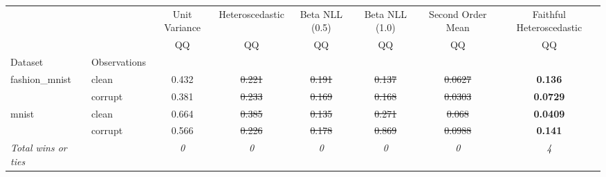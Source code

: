 \begin{tabular}{ll|c|c|c|c|c|c}
\toprule
{} & {} & {Unit Variance} & {Heteroscedastic} & {Beta NLL (0.5)} & {Beta NLL (1.0)} & {Second Order Mean} & {Faithful Heteroscedastic} \\
{} & {} & {QQ} & {QQ} & {QQ} & {QQ} & {QQ} & {QQ} \\
{Dataset} & {Observations} & {} & {} & {} & {} & {} & {} \\
\midrule
\multirow[t]{2}{*}{fashion_mnist} & clean & 0.432 & \sout{0.221} & \sout{0.191} & \sout{0.137} & \sout{0.0627} & \textbf{0.136} \\
 & corrupt & 0.381 & \sout{0.233} & \sout{0.169} & \sout{0.168} & \sout{0.0303} & \textbf{0.0729} \\
\multirow[t]{2}{*}{mnist} & clean & 0.664 & \sout{0.385} & \sout{0.135} & \sout{0.271} & \sout{0.068} & \textbf{0.0409} \\
 & corrupt & 0.566 & \sout{0.226} & \sout{0.178} & \sout{0.869} & \sout{0.0988} & \textbf{0.141} \\
\textit{{Total wins or ties}} &  & \textit{0} & \textit{0} & \textit{0} & \textit{0} & \textit{0} & \textit{4} \\
\bottomrule
\end{tabular}
